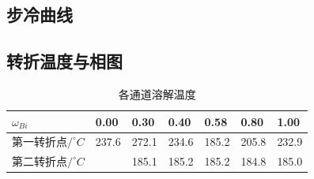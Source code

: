 \documentclass[12pt,hyperref,a4paper,UTF8]{ctexart}
\begin{document}
\subsection{步冷曲线}
\begin{figure}[H]
\centering
{}
\end{figure}


\subsection{转折温度与相图}
\begin{table}[htp]
\centering
\caption{各通道溶解温度}
\begin{tabular}{|l|l|l|l|l|l|l|}
\hline
$\omega _{Bi}$     & 0.00  & 0.30  & 0.40  & 0.58  & 0.80  & 1.00  \\ \hline
第一转折点$/^{\circ}C$ & 237.6 & 272.1 & 234.6 & 185.2 & 205.8 & 232.9 \\ \hline
第二转折点$/^{\circ}C$ &       & 185.1 & 185.2 & 185.2 & 184.8 & 185.0 \\ \hline
\end{tabular}
\end{table}
\end{document}

